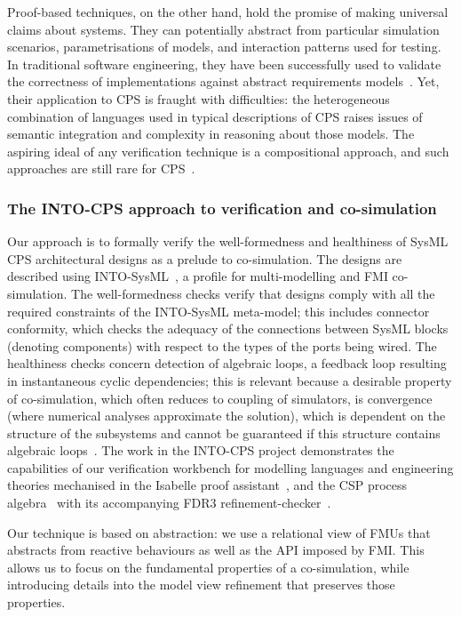 Proof-based techniques, on the other hand, hold the promise of making universal claims about systems. They can potentially abstract from particular simulation scenarios, parametrisations of models, and interaction patterns used for testing. In traditional software engineering, they have been successfully used to validate the correctness of implementations against abstract requirements models~\cite{WoodcockLBF2009}. Yet, their application to CPS is fraught with difficulties: the heterogeneous combination of languages used in typical descriptions of CPS raises issues of semantic integration and complexity in reasoning about those models. The aspiring ideal of any verification technique is a compositional approach, and such approaches are still rare for CPS~\cite{NuzzoLFS2018}.

\subsubsection{The INTO-CPS approach to verification and co-simulation}

Our approach is to formally verify the well-formedness and healthiness of SysML CPS architectural designs as a prelude to co-simulation. The designs are described using INTO-SysML~\cite{INTO-CPS-D2.1a-2015}, a profile for multi-modelling and FMI co-simulation. The well-formedness checks verify that designs comply with all the required constraints of the INTO-SysML meta-model; this includes connector conformity, which checks the adequacy of the connections between SysML blocks (denoting components) with respect to the types of the ports being wired. The healthiness checks concern detection of algebraic loops, a feedback loop resulting in instantaneous cyclic dependencies; this is relevant because a desirable property of co-simulation, which often reduces to coupling of simulators, is convergence (where numerical analyses approximate the solution), which is dependent on the structure of the subsystems and cannot be guaranteed if this structure contains algebraic loops~\cite{KublerS2000,BromanBGLMTW2013}. The work in the INTO-CPS project demonstrates the capabilities of our verification workbench for modelling languages and engineering theories mechanised in the Isabelle proof assistant~\cite{NipkowK2014}, and the CSP process algebra~\cite{Hoare1985} with its accompanying FDR3 refinement-checker~\cite{GibsonRobinsonABR2016}.

Our technique is based on abstraction: we use a relational view of FMUs that abstracts from reactive behaviours as well as the API imposed by FMI. This allows us to focus on the fundamental properties of a co-simulation, while introducing details into the model view refinement that preserves those properties.

